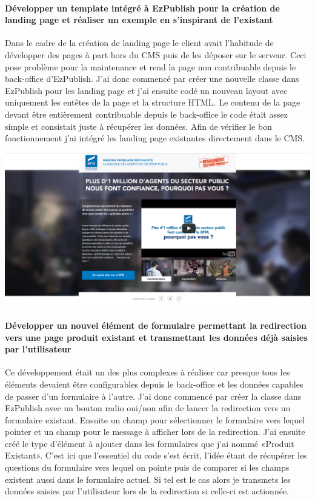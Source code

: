 \documentclass[a4paper,11pt,twoside]{report}
\begin{document}
      \paragraph*{Développer un template intégré à EzPublish pour la création de landing page et réaliser un exemple en s'inspirant de l'existant}
      Dans le cadre de la création de landing page le client avait l'habitude de développer des pages à part hors du CMS puis de les déposer sur le serveur. Ceci pose problème pour la maintenance et rend la page non contribuable depuis le back-office d'EzPublish. J'ai donc commencé par créer une nouvelle classe dans EzPublish pour les landing page et j'ai ensuite codé un nouveau layout avec uniquement les entêtes de la page et la structure HTML. Le contenu de la page devant être entièrement contribuable depuis le back-office le code était assez simple et consistait juste à récupérer les données. Afin de vérifier le bon fonctionnement j'ai intégré les landing page existantes directement dans le CMS.
      \begin{center}
	\includegraphics[width=\textwidth]{images/landing_page1.png} 
	\label{landing_page}
      \end{center}
      \paragraph*{Développer un nouvel élément de formulaire permettant la redirection vers une page produit existant et transmettant les données déjà saisies par l'utilisateur}
      Ce développement était un des plus complexes à réaliser car presque tous les éléments devaient être configurables depuis le back-office et les données capables de passer d'un formulaire à l'autre. J'ai donc commencé par créer la classe dans EzPublish avec un bouton radio oui/non afin de lancer la redirection vers un formulaire existant. Ensuite un champ pour sélectionner le formulaire vers lequel pointer et un champ pour le message à afficher lors de la redirection. 
      J'ai ensuite créé le type d'élément à ajouter dans les formulaires que j'ai nommé «Produit Existant». C'est ici que l'essentiel du code s'est écrit, l'idée étant de récupérer les questions du formulaire vers lequel on pointe puis de comparer si les champs existent aussi dans le formulaire actuel. Si tel est le cas alors je transmets les données saisies par l'utilisateur lors de la redirection si celle-ci est actionnée. 
      
\end{document}
